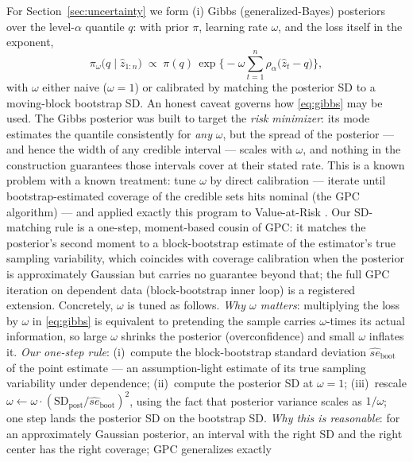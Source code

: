 \documentclass[11pt]{article}
\theoremstyle{remark}
\begin{document}
For Section~\ref{sec:uncertainty} we form (i) Gibbs (generalized-Bayes)
posteriors over the level-$\alpha$ quantile $q$: with prior $\pi$,
learning rate $\omega$, and the loss itself in the exponent,
\begin{equation}
\pi_\omega\big(q \mid \widehat{z}_{1:n}\big) \;\propto\;
\pi(q)\,
\exp\Big\{-\omega \sum_{t=1}^{n}
\rho_\alpha\big(\widehat{z}_t - q\big)\Big\},
\label{eq:gibbs}
\end{equation}
with $\omega$ either naive ($\omega=1$) or calibrated by matching the
posterior SD to a moving-block bootstrap SD. An honest caveat governs
how \eqref{eq:gibbs} may be used. The Gibbs posterior was built to
target the \emph{risk minimizer}: its mode estimates the quantile
consistently for \emph{any} $\omega$, but the spread of the posterior
--- and hence the width of any credible interval --- scales with
$\omega$, and nothing in the construction guarantees those intervals
cover at their stated rate. This is a known problem with a known
treatment: \citet{syring2019gpc} tune $\omega$ by direct calibration
--- iterate until bootstrap-estimated coverage of the credible sets
hits nominal (the GPC algorithm) --- and applied exactly this program
to Value-at-Risk \citep{syringmartin2019var}. Our SD-matching rule is a
one-step, moment-based cousin of GPC: it matches the posterior's
second moment to a block-bootstrap estimate of the estimator's true
sampling variability, which coincides with coverage calibration when
the posterior is approximately Gaussian but carries no guarantee
beyond that; the full GPC iteration on dependent data (block-bootstrap
inner loop) is a registered extension. Concretely, $\omega$ is tuned as
follows. \emph{Why $\omega$ matters}: multiplying the loss by $\omega$
in \eqref{eq:gibbs} is equivalent to pretending the sample carries
$\omega$-times its actual information, so large $\omega$ shrinks the
posterior (overconfidence) and small $\omega$ inflates it. \emph{Our
one-step rule}: (i)~compute the block-bootstrap standard deviation
$\widehat{se}_{\mathrm{boot}}$ of the point estimate --- an
assumption-light estimate of its true sampling variability under
dependence; (ii)~compute the posterior SD at $\omega=1$; (iii)~rescale
$\omega \leftarrow \omega \cdot
(\mathrm{SD}_{\mathrm{post}}/\widehat{se}_{\mathrm{boot}})^{2}$, using
the fact that posterior variance scales as $1/\omega$; one step lands
the posterior SD on the bootstrap SD. \emph{Why this is reasonable}:
for an approximately Gaussian posterior, an interval with the right SD
and the right center has the right coverage; GPC generalizes exactly
\end{document}
